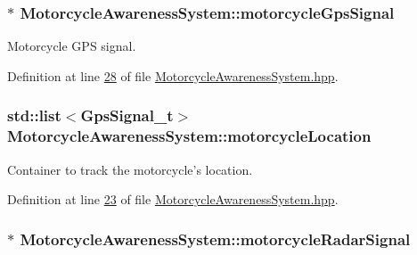 \hypertarget{classMotorcycleAwarenessSystem_ab281a3993b574923b2f379ed0477b2d4}{
\subsubsection[{motorcycle\-Gps\-Signal}]{$\ast$ Motorcycle\-Awareness\-System\-::motorcycle\-Gps\-Signal\hspace{0.3cm}{\ttfamily [private]}}}\label{classMotorcycleAwarenessSystem_ab281a3993b574923b2f379ed0477b2d4}


Motorcycle G\-P\-S signal. 



Definition at line \hyperlink{MotorcycleAwarenessSystem_8hpp_source_l00028}{28} of file \hyperlink{MotorcycleAwarenessSystem_8hpp_source}{Motorcycle\-Awareness\-System.\-hpp}.

\hypertarget{classMotorcycleAwarenessSystem_af6becfeb1d11b467cb80a94a8e6940ac}{
\subsubsection[{motorcycle\-Location}]{\setlength{\rightskip}{0pt plus 5cm}std\-::list$<${\bf Gps\-Signal\-\_\-t}$>$ Motorcycle\-Awareness\-System\-::motorcycle\-Location\hspace{0.3cm}{\ttfamily [private]}}}\label{classMotorcycleAwarenessSystem_af6becfeb1d11b467cb80a94a8e6940ac}


Container to track the motorcycle's location. 



Definition at line \hyperlink{MotorcycleAwarenessSystem_8hpp_source_l00023}{23} of file \hyperlink{MotorcycleAwarenessSystem_8hpp_source}{Motorcycle\-Awareness\-System.\-hpp}.

\hypertarget{classMotorcycleAwarenessSystem_a0744e71b9f440a86f5078c876ba7629b}{
\subsubsection[{motorcycle\-Radar\-Signal}]{$\ast$ Motorcycle\-Awareness\-System\-::motorcycle\-Radar\-Signal\hspace{0.3cm}{\ttfamily [private]}}}\label{classMotorcycleAwarenessSystem_a0744e71b9f440a86f5078c876ba7629b}


